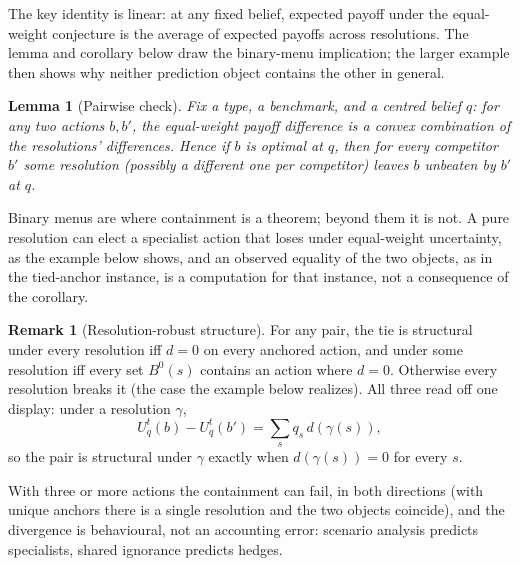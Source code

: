 \documentclass[12pt]{article}
\newtheorem{lemma}{Lemma}
\theoremstyle{definition}
\newtheorem{remark}{Remark}
\begin{document}
The key identity is linear: at any fixed belief, expected payoff under the equal-weight conjecture is the average of expected payoffs across resolutions. The lemma and corollary below draw the binary-menu implication; the larger example then shows why neither prediction object contains the other in general.

\begin{lemma}[Pairwise check]\label{lem:pairwise}
Fix a type, a benchmark, and a centred belief $q$: for any two actions $b, b'$, the equal-weight payoff difference is a convex combination of the resolutions' differences. Hence if $b$ is optimal at $q$, then for every competitor $b'$ some resolution (possibly a different one per competitor) leaves $b$ unbeaten by $b'$ at $q$.
\end{lemma}

Binary menus are where containment is a theorem; beyond them it is not. A pure resolution can elect a specialist action that loses under equal-weight uncertainty, as the example below shows, and an observed equality of the two objects, as in the tied-anchor instance, is a computation for that instance, not a consequence of the corollary.

\begin{remark}[Resolution-robust structure]\label{rem:resrobust}
For any pair, the tie is structural under every resolution iff $d=0$ on every anchored action, and under some resolution iff every set $B^0(s)$ contains an action where $d=0$. Otherwise every resolution breaks it (the case the example below realizes). All three read off one display: under a resolution $\gamma$,
\[
U^t_q(b)-U^t_q(b')=\sum_s q_s\,d(\gamma(s)),
\]
so the pair is structural under $\gamma$ exactly when $d(\gamma(s))=0$ for every $s$.
\end{remark}

With three or more actions the containment can fail, in both directions (with unique anchors there is a single resolution and the two objects coincide), and the divergence is behavioural, not an accounting error: scenario analysis predicts specialists, shared ignorance predicts hedges.
\end{document}
